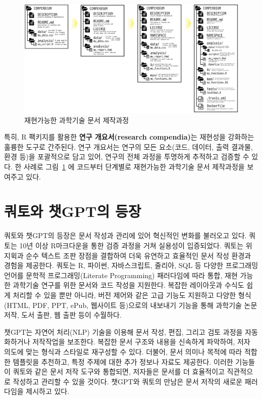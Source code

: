 \documentclass[
  letterpaper,
]{book}
\begin{document}
\begin{figure}

{\centering \includegraphics{images/compendium-rr.png}

}

\caption{\label{fig-compendium}재현가능한 과학기술 문서 제작과정}

\end{figure}

특히, R 팩키지를 활용한 \textbf{연구 개요서(research compendia)}는
재현성을 강화하는 훌륭한 도구로 간주된다. 연구 개요서는 연구의 모든
요소(코드, 데이터, 출력 결과물, 환경 등)을 포괄적으로 담고 있어, 연구의
전체 과정을 투명하게 추적하고 검증할 수 있다. 한 사례로
그림~\ref{fig-compendium} 에 코드부터 단계별로 재현가능한 과학기술 문서
제작과정을 보여주고 있다.

\hypertarget{uxcffcuxd1a0uxc640-uxcc57gptuxc758-uxb4f1uxc7a5}{%
\section{쿼토와 챗GPT의
등장}\label{uxcffcuxd1a0uxc640-uxcc57gptuxc758-uxb4f1uxc7a5}}

쿼토와 챗GPT의 등장은 문서 작성과 관리에 있어 혁신적인 변화를 불러오고
있다. 쿼토는 10년 이상 R마크다운을 통한 검증 과정을 거쳐 실용성이
입증되었다. 쿼토는 위지윅과 순수 텍스트 조판 장점을 결합하여 더욱
유연하고 효율적인 문서 작성 환경과 경험을 제공한다. 쿼토는 R, 파이썬,
자바스크립트, 줄리아, SQL 등 다양한 프로그래밍 언어를 문학적
프로그래밍(Literate Programming) 패러다임에 따라 통합, 재현 가능한
과학기술 연구를 위한 문서와 코드 작성을 지원한다. 복잡한 레이아웃과
수식도 쉽게 처리할 수 있을 뿐만 아니라, 버전 제어와 같은 고급 기능도
지원하고 다양한 형식(HTML, PDF, PPT, ePub, 웹사이트 등)으로의 내보내기
기능을 통해 과학기술 논문 저작, 도서 출판, 웹 출판 등이 수월하다.

챗GPT는 자연어 처리(NLP) 기술을 이용해 문서 작성, 편집, 그리고 검토
과정을 자동화하거나 저작작업을 보조한다. 복잡한 문서 구조와 내용을
신속하게 파악하여, 저자 의도에 맞는 형식과 스타일로 재구성할 수 있다.
더불어, 문서 의미나 목적에 따라 적합한 템플릿을 추천하고, 특정 주제에
대한 추가 정보나 자료도 제공한다. 이러한 기능들이 쿼토와 같은 문서 저작
도구와 통합되면, 저자들은 문서를 더 효율적이고 직관적으로 작성하고
관리할 수 있을 것이다. 챗GPT와 쿼토의 만남은 문서 저작의 새로운
패러다임을 제시하고 있다.
\end{document}
